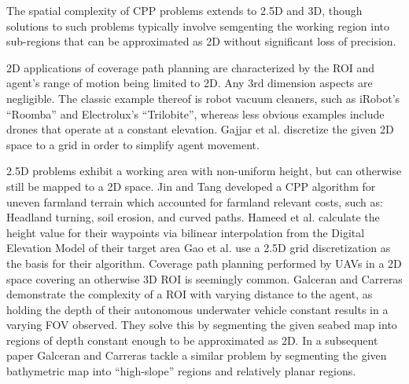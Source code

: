The spatial complexity of CPP problems extends to 2.5D and 3D, though solutions to such problems typically involve semgenting the working region into sub-regions that can be approximated as 2D without significant loss of precision.

2D applications of coverage path planning are characterized by the ROI and agent's range of motion being limited to 2D.
Any 3rd dimension aspects are negligible.
The classic example thereof is robot vacuum cleaners, such as iRobot's ``Roomba'' and Electrolux's ``Trilobite''\cite{CCPP_cleaning_robots}, whereas less obvious examples include drones that operate at a constant elevation\cite{CPP_2D_convex_regions_uav}.
Gajjar et al. discretize the given 2D space to a grid in order to simplify agent movement\cite{CCPP_known_2D_env}.

2.5D problems exhibit a working area with non-uniform height, but can otherwise still be mapped to a 2D space.
Jin and Tang developed a CPP algorithm for uneven farmland terrain which accounted for farmland relevant costs, such as: Headland turning, soil erosion, and curved paths\cite{CPP_farming_terrain}.
Hameed et al. calculate the height value for their waypoints via bilinear interpolation from the Digital Elevation Model of their target area\cite{CPP_2.5D_agriculture}
Gao et al. use a 2.5D grid discretization as the basis for their algorithm\cite{CPP_2.5D_grid_map}.
Coverage path planning performed by UAVs in a 2D space covering an otherwise 3D ROI is seemingly common\cite{CPP_2.5D_SAA_grid_based_UAV_3D_recons, CPP_2.5D_UAV_3D_terrain_recons, CPP_multi_UAV, CPP_2D_convex_regions_uav}.
Galceran and Carreras demonstrate the complexity of a ROI with varying distance to the agent\cite{CPP_2.5D_seabed_2012}, as holding the depth of their autonomous underwater vehicle constant results in a varying FOV observed.
They solve this by segmenting the given seabed map into regions of depth constant enough to be approximated as 2D.
In a subsequent paper Galceran and Carreras tackle a similar problem by segmenting the given bathymetric map into ``high-slope'' regions and relatively planar regions\cite{CPP_2.5D_seabed_2013}.

